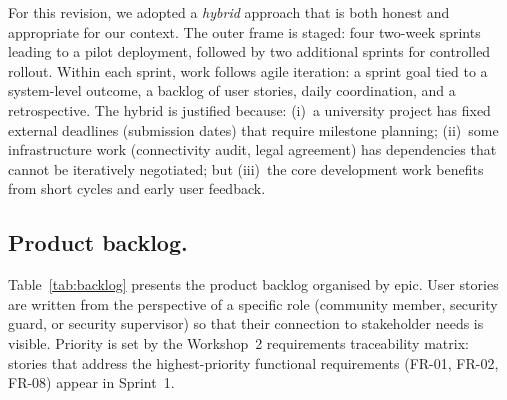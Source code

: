 \documentclass[12pt,a4paper]{article}
\begin{document}
For this revision, we adopted a \emph{hybrid} approach that is both
honest and appropriate for our context. The outer frame is staged:
four two-week sprints leading to a pilot deployment, followed by
two additional sprints for controlled rollout. Within each sprint,
work follows agile iteration: a sprint goal tied to a system-level
outcome, a backlog of user stories, daily coordination, and a
retrospective. The hybrid is justified because: (i)~a university
project has fixed external deadlines (submission dates) that require
milestone planning; (ii)~some infrastructure work (connectivity
audit, legal agreement) has dependencies that cannot be iteratively
negotiated; but (iii)~the core development work benefits from
short cycles and early user feedback.

\subsection{Product backlog.}
Table~\ref{tab:backlog} presents the product backlog organised by
epic. User stories are written from the perspective of a specific
role (community member, security guard, or security supervisor) so
that their connection to stakeholder needs is visible. Priority is
set by the Workshop~2 requirements traceability matrix: stories
that address the highest-priority functional requirements (FR-01,
FR-02, FR-08) appear in Sprint~1.
\end{document}
